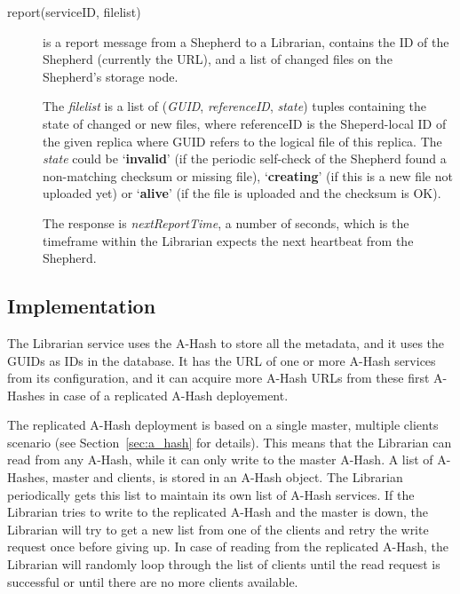 \documentclass{book}
\begin{document}
\begin{description}
    \item [report(serviceID, filelist)] is a report message from a Shepherd to a Librarian, contains the ID of the Shepherd (currently the URL), and a list of changed files on the Shepherd's storage node.
        
    The \emph{filelist} is a list of (\emph{GUID}, \emph{referenceID}, \emph{state}) tuples containing the state of changed or new files, where referenceID is the Sheperd-local ID of the given replica where GUID refers to the logical file of this replica. The \emph{state} could be `\textbf{invalid}' (if the periodic self-check of the Shepherd found a non-matching checksum or missing file), `\textbf{creating}' (if this is a new file not uploaded yet) or `\textbf{alive}' (if the file is uploaded and the checksum is OK).
    
    The response is \emph{nextReportTime}, a number of seconds, which is the timeframe within the Librarian expects the next heartbeat from the Shepherd.

\end{description}


\subsection{Implementation} %

The Librarian service uses the A-Hash to store all the metadata, and it uses the GUIDs as IDs in the database. It has the URL of one or more A-Hash services from its configuration, and it can acquire more A-Hash URLs from these first A-Hashes in case of a replicated A-Hash deployement.

The replicated A-Hash deployment is based on a single master, multiple clients scenario (see Section~\ref{sec:a_hash} for details). This means that the Librarian can read from any A-Hash, while it can only write to the master A-Hash. A list of A-Hashes, master and clients, is stored in an A-Hash object. The Librarian periodically gets this list to maintain its own list of A-Hash services. If the Librarian tries to write to the replicated A-Hash and the master is down, the Librarian will try to get a new list from one of the clients and retry the write request once before giving up. In case of reading from the replicated A-Hash, the Librarian will randomly loop through the list of clients until the read request is successful or until there are no more clients available.
\end{document}
